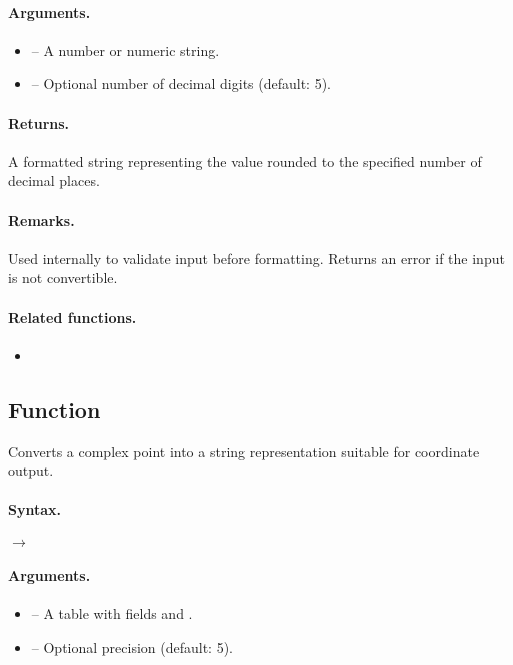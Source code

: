 \paragraph{Arguments.}
\begin{itemize}
\item {} – A number or numeric string.
\item {} – Optional number of decimal digits (default: 5).
\end{itemize}

\paragraph{Returns.}
A formatted string representing the value rounded to the specified number of decimal places.

\paragraph{Remarks.}
Used internally to validate input before formatting. Returns an error if the input is not convertible.

\paragraph{Related functions.}
\begin{itemize}
\item {}
\end{itemize}

\subsection{Function }
\label{sub:function_utils_format_point}

Converts a complex point into a string representation suitable for coordinate output.

\paragraph{Syntax.}
\begin{center}
 \hfill $\rightarrow$ 
\end{center}

\paragraph{Arguments.}
\begin{itemize}
\item {} – A table with fields  and .
\item {} – Optional precision (default: 5).
\end{itemize}

